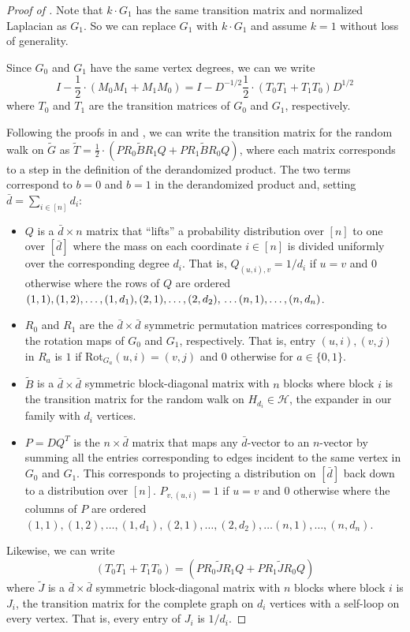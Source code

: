 \documentclass{toc}
\newcommand{\wt}{\widetilde}   %
\numberwithin{myalgctr}{section}
\theoremstyle{named}
\begin{document}
\begin{proof}[Proof of ]
Note that $k\cdot G_1$ has the same transition matrix and normalized Laplacian as $G_1$. So we can replace $G_1$ with $k\cdot G_1$ and assume $k=1$ without loss of generality. 

Since $G_0$ and $G_1$ have the same vertex degrees, we can we write
\begin{equation}
\label{eq:1}
I-\frac{1}{2}\cdot(M_0M_1+M_1M_0) = I-D^{-1/2}\frac{1}{2}\cdot(T_0T_1+T_1T_0)D^{1/2}
\end{equation}
where $T_0$ and $T_1$ are the transition matrices of $G_0$ and $G_1$, respectively.

Following the proofs in \cite{RozenmanVa05} and \cite{derandbeyond2017}, we can write the transition matrix for the random walk on $\wt{G}$ as $\wt{T}=\frac{1}{2}\cdot(P R_0 \wt{B} R_1 Q + P R_1 \wt{B} R_0 Q)$, where each matrix corresponds to a step in the definition of the derandomized product. The two terms correspond to $b=0$ and $b=1$ in the derandomized product and, setting $\bar{d}=\sum_{i\in[n]}d_i$:
\begin{itemize}
\item $Q$ is a $\bar{d}\times n$ matrix that ``lifts'' a probability distribution over $[n]$ to one over $[\bar{d}]$ where the mass on each coordinate $i\in[n]$ is divided uniformly over the corresponding degree $d_i$. That is, $Q_{(u,i),v}=1/d_{i}$ if $u=v$ and 0 otherwise where the rows of $Q$ are ordered $(1,1),(1,2),\ldots,(1,d_1),(2,1),\ldots,(2,d_2),\\ \ldots(n,1),\ldots,(n,d_n)$.
\item $R_0$ and $R_1$ are the $\bar{d}\times \bar{d}$ symmetric permutation matrices corresponding to the rotation maps of $G_0$ and $G_1$, respectively. That is, entry $(u,i),(v,j)$ in $R_a$ is $1$ if Rot$_{G_{a}}(u,i)=(v,j)$ and 0 otherwise for $a\in\{0,1\}$.
\item $\wt{B}$ is a $\bar{d}\times \bar{d}$ symmetric block-diagonal matrix with $n$ blocks where block $i$ is the transition matrix for the random walk on $H_{d_{i}}\in\mathcal{H}$, the expander in our family with $d_i$ vertices.
\item $P=DQ^{T}$ is the $n\times \bar{d}$ matrix that maps any $\bar{d}$-vector to an $n$-vector by summing all the entries corresponding to edges incident to the same vertex in $G_0$ and $G_1$. This corresponds to projecting a distribution on $[\bar{d}]$ back down to a distribution over $[n]$. $P_{v,(u,i)}=1$ if $u=v$ and 0 otherwise where the columns of $P$ are ordered $(1,1),(1,2),\ldots,(1,d_1),(2,1),\ldots,(2,d_2),\ldots(n,1),\ldots,(n,d_n)$.
\end{itemize}
Likewise, we can write
\begin{equation}
\label{eq:2}
(T_0T_1+T_1T_0)=(P R_0 \wt{J} R_1 Q + P R_1 \wt{J} R_0 Q)
\end{equation}
where $\wt{J}$ is a $\bar{d}\times \bar{d}$ symmetric block-diagonal matrix with $n$ blocks where block $i$ is $J_i$, the transition matrix for the complete graph on $d_i$ vertices with a self-loop on every vertex. That is, every entry of $J_i$ is $1/d_i$.


\end{proof}
\end{document}
